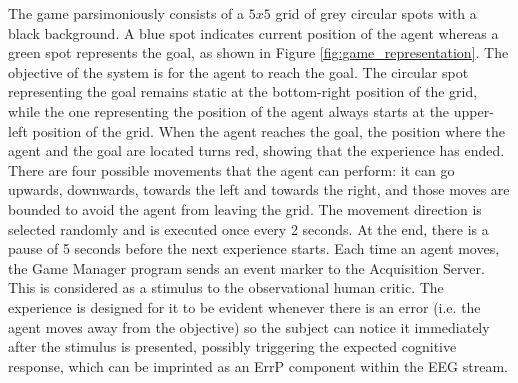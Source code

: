\documentclass[journal]{IEEEtran}
\begin{document}
\label{cognitive_experiment_system}{
The game parsimoniously consists of a $5x5$ grid of grey circular spots with a black background.  A blue spot indicates current position of the agent whereas a green spot represents the goal, as shown in Figure  \ref{fig:game_representation}. The objective of the system is for the agent to reach the goal. The circular spot representing the goal remains static at the bottom-right position of the grid, while the one representing the position of the agent always starts at the upper-left position of the grid.  When the agent reaches the goal, the position where the agent and the goal are located turns red, showing that the experience has ended. There are four possible movements that the agent can perform: it can go upwards, downwards, towards the left and towards the right, and those moves are bounded to avoid the agent from leaving the grid. The movement direction is selected randomly and is executed once every 2 seconds.  At the end, there is a pause of 5 seconds before the next experience starts. Each time an agent moves, the Game Manager program sends an event marker to the Acquisition Server.  This is considered as a stimulus to the observational human critic.  The experience is designed for it to be evident whenever there is an error (i.e. the agent moves away from the objective) so the subject can notice it immediately after the stimulus is presented, possibly triggering the expected cognitive response, which can be imprinted as an ErrP component within the EEG stream.

}
\end{document}
